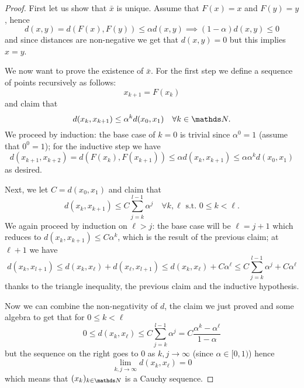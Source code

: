 \documentclass[12pt]{extarticle}
\begin{document}
\begin{proof}
    First let us show that $\bar x$ is unique.
    Assume that $F(x) = x$ and $F(y) = y$, hence
    \begin{equation}
        d(x, y) = d(F(x), F(y)) \leq \alpha d(x, y) \implies (1-\alpha) d(x, y) \leq 0
    \end{equation}
    and since distances are non-negative we get that $d(x, y) = 0$ but this implies $x = y$.

    We now want to prove the existence of $\bar x$.
    For the first step we define a sequence of points recursively as follows:
    \begin{equation}
        x_{k + 1} = F(x_k)
    \end{equation}
    and claim that
    \begin{equation}
        d(x_k, x_{k+1}) \leq \alpha^k d(x_0, x_1) \quad \forall k \in \N .
    \end{equation}
    We proceed by induction: the base case of $k = 0$ is trivial since $\alpha^0 = 1$ (assume that $0^0=1$);
    for the inductive step we have
    \begin{equation}
        d(x_{k+1}, x_{k+2}) = d(F(x_k), F(x_{k+1})) \leq \alpha d(x_k, x_{k+1}) \leq \alpha \alpha^k d(x_0, x_1)
    \end{equation}
    as desired.

    Next, we let $C = d(x_0, x_1)$ and claim that
    \begin{equation}
        d(x_k, x_{k+1}) \leq C \sum_{j = k}^{l-1} \alpha^j \quad \forall k, \ell \text{ s.t. } 0 \leq k < \ell.
    \end{equation}
    We again proceed by induction on $\ell > j$:
    the base case will be $\ell = j + 1$ which reduces to $d(x_k, x_{k+1}) \leq C \alpha^k$, which is the result of the previous claim;
    at $\ell + 1$ we have
    \begin{equation}
        d(x_k, x_{l+1}) \leq d(x_k, x_\ell) + d(x_\ell, x_{l + 1}) \leq d(x_k, x_\ell) + C \alpha^\ell \leq C\sum_{j = k}^{l-1} \alpha^j + C \alpha^\ell
    \end{equation}
    thanks to the triangle inequality, the previous claim and the inductive hypothesis.

    Now we can combine the non-negativity of $d$, the claim we just proved and some algebra to get that for $0 \leq k < \ell$
    \begin{equation}
        0 \leq d(x_k, x_\ell) \leq C \sum_{j = k}^{l-1} \alpha^j = C \frac{\alpha^k - \alpha^\ell}{1-\alpha}
    \end{equation}
    but the sequence on the right goes to $0$ as $k, j \to \infty$ (since $\alpha \in [0, 1)$) hence
    \begin{equation}
        \lim_{k, j \to \infty} d(x_k, x_{\ell}) = 0
    \end{equation}
    which means that $(x_k)_{k \in \N}$ is a Cauchy sequence.


\end{proof}
\end{document}
